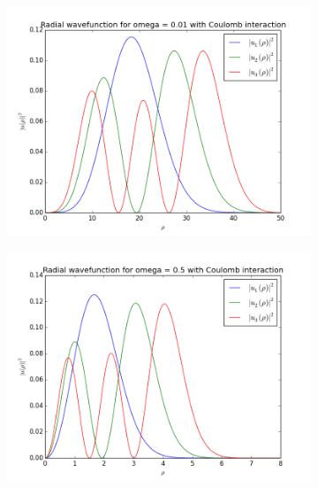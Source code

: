 \documentclass{article}
\begin{document}
\FloatBarrier
\begin{figure}[!ht]
\begin{subfigure}{.6\textwidth}
  \includegraphics[width=1.1\linewidth]{2e_0_01_ON.png}
  \label{fig:sfig1}
\end{subfigure}
\begin{subfigure}{.6\textwidth}
  \includegraphics[width=1.1\linewidth]{2e_0_5_ON.png}
  \label{fig:sfig2}
\end{subfigure}
\label{fig:animasjon}
\end{figure}
\FloatBarrier
\end{document}
